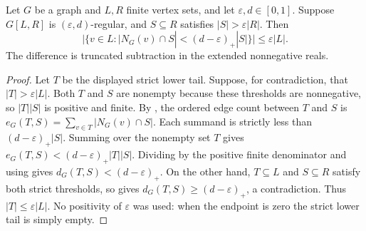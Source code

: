 \begin{lemma}
Let $G$ be a graph and $L,R$ finite vertex sets, and let $\varepsilon,d\in[0,1]$.
Suppose $G[L,R]$ is $(\varepsilon,d)$-regular, and $S\subseteq R$ satisfies $|S|>\varepsilon|R|$.
Then
\[
 |\{v\in L:|N_G(v)\cap S|<(d-\varepsilon)_+|S|\}|\leq\varepsilon|L|.
\]
The difference is truncated subtraction in the extended nonnegative reals.
\end{lemma}
\begin{proof}
Let $T$ be the displayed strict lower tail. Suppose, for contradiction, that $|T|>\varepsilon|L|$.
Both $T$ and $S$ are nonempty because these thresholds are nonnegative, so $|T||S|$ is positive and finite.
By , the ordered edge count between $T$ and $S$ is
$e_G(T,S)=\sum_{v\in T}|N_G(v)\cap S|$.
Each summand is strictly less than $(d-\varepsilon)_+|S|$.
Summing over the nonempty set $T$ gives
$e_G(T,S)<(d-\varepsilon)_+|T||S|$.
Dividing by the positive finite denominator and using  gives
$d_G(T,S)<(d-\varepsilon)_+$.
On the other hand, $T\subseteq L$ and $S\subseteq R$ satisfy both strict thresholds, so  gives $d_G(T,S)\geq(d-\varepsilon)_+$, a contradiction.
Thus $|T|\leq\varepsilon|L|$.
No positivity of $\varepsilon$ was used: when the endpoint is zero the strict lower tail is simply empty.
\end{proof}

